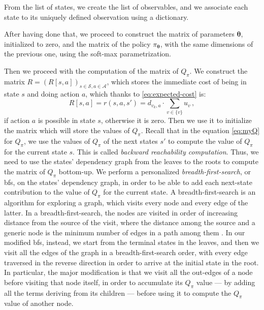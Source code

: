 From the list of states, we create the list of observables, and we associate each state to its uniquely defined observation using a dictionary.

After having done that, we proceed to construct the matrix of parameters $\boldsymbol \theta$, initialized to zero, and the matrix of the policy $\pi_{\boldsymbol \theta}$, with the same dimensions of the previous one, using the soft-max parametrization.

Then we proceed with the computation of the matrix of $Q_\pi$. We construct the matrix $R = (R[s,a])_{s \in \mathcal S, a \in \mathcal A}$, which stores the immediate cost of being in state $s$ and doing action $a$, which thanks to \eqref{eq:expected-cost} is:
\begin{equation}
    R[s,a] = r(s,a,s') = d_{v_k, a} \cdot \sum_{v \in \{v\}} u_v \, ,
\end{equation}
if action $a$ is possible in state $s$, otherwise it is zero. Then we use it to initialize the matrix which will store the values of $Q_\pi$. Recall that in the equation \eqref{eq:myQ} for $Q_\pi$, we use the values of $Q_\pi$ of the next states $s'$ to compute the value of $Q_\pi$ for the current state $s$. This is called \emph{backward reachability computation}. Thus, we need to use the states' dependency graph from the leaves to the roots to compute the matrix of $Q_\pi$ bottom-up. We perform a personalized \emph{breadth-first-search}, or \acrshort{bfs}, on the states' dependency graph, in order to be able to add each next-state contribution to the value of $Q_\pi$ for the current state. A breadth-first-search is an algorithm for exploring a graph, which visits every node and every edge of the latter. In a breadth-first-search, the nodes are visited in order of increasing distance from the source of the visit, where the distance among the source and a generic node is the minimum number of edges in a path among them \cite{Montresor2014}. In our modified \acrshort{bfs}, instead, we start from the terminal states in the leaves, and then we visit all the edges of the graph in a breadth-first-search order, with every edge traversed in the reverse direction in order to arrive at the initial state in the root. In particular, the major modification is that we visit all the out-edges of a node before visiting that node itself, in order to accumulate its $Q_\pi$ value --- by adding all the terms deriving from its children --- before using it to compute the $Q_\pi$ value of another node.

